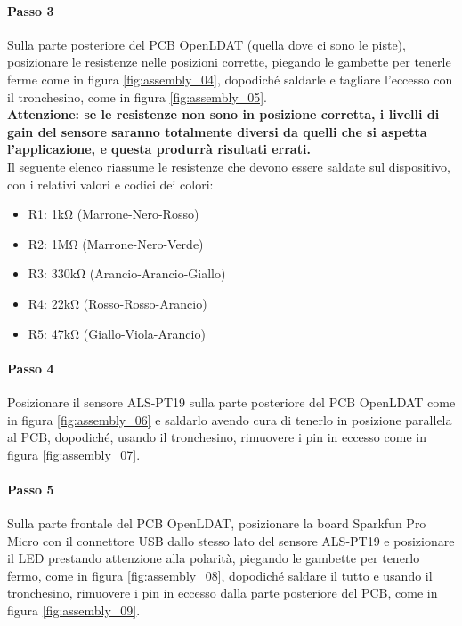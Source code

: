 \paragraph{Passo 3} Sulla parte posteriore del PCB OpenLDAT (quella dove ci sono le piste), posizionare le resistenze nelle posizioni corrette, piegando le gambette per tenerle ferme come in figura \ref{fig:assembly_04}, dopodiché saldarle e tagliare l'eccesso con il tronchesino, come in figura \ref{fig:assembly_05}.\\
\textbf{Attenzione: se le resistenze non sono in posizione corretta, i livelli di gain del sensore saranno totalmente diversi da quelli che si aspetta l'applicazione, e questa produrrà risultati errati.}\\
Il seguente elenco riassume le resistenze che devono essere saldate sul dispositivo, con i relativi valori e codici dei colori:
\begin{itemize}
	\item R1: 1k\si{\ohm} (Marrone-Nero-Rosso)
	\item R2: 1M\si{\ohm} (Marrone-Nero-Verde)
	\item R3: 330k\si{\ohm} (Arancio-Arancio-Giallo)
	\item R4: 22k\si{\ohm} (Rosso-Rosso-Arancio)
	\item R5: 47k\si{\ohm} (Giallo-Viola-Arancio)
\end{itemize}

\paragraph{Passo 4} Posizionare il sensore ALS-PT19 sulla parte posteriore del PCB OpenLDAT come in figura \ref{fig:assembly_06} e saldarlo avendo cura di tenerlo in posizione parallela al PCB, dopodiché, usando il tronchesino, rimuovere i pin in eccesso come in figura \ref{fig:assembly_07}.

\paragraph{Passo 5} Sulla parte frontale del PCB OpenLDAT, posizionare la board Sparkfun Pro Micro con il connettore USB dallo stesso lato del sensore ALS-PT19 e posizionare il LED prestando attenzione alla polarità, piegando le gambette per tenerlo fermo, come in figura \ref{fig:assembly_08}, dopodiché saldare il tutto e usando il tronchesino, rimuovere i pin in eccesso dalla parte posteriore del PCB, come in figura \ref{fig:assembly_09}.

